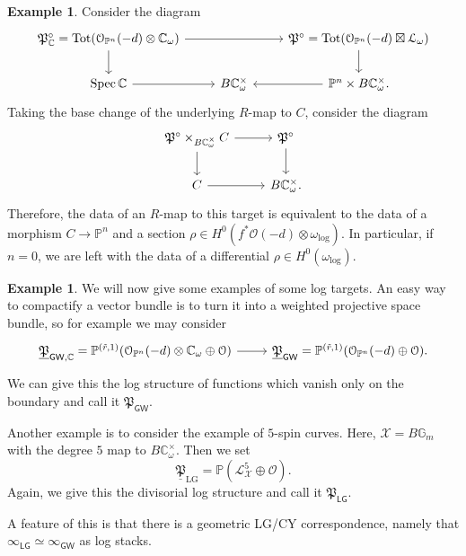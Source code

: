 \documentclass[10pt,oldfontcommands,oneside]{memoir}
\theoremstyle{definition}
\newtheorem{exm}[thm]{Example}
\theoremstyle{remark}
\theoremstyle{plain}
\theoremstyle{definition}
\theoremstyle{remark}
\newcommand{\G}{\mathbb{G}}
\newcommand{\C}{\mathbb{C}}
\renewcommand{\P}{\mathbb{P}}
\newcommand{\mc}[1]{\mathcal{#1}}
\newcommand{\mf}[1]{\mathfrak{#1}}
\newcommand{\mr}[1]{\mathrm{#1}}
\newcommand{\on}[1]{\operatorname{#1}}
\newcommand{\ms}[1]{\mathsf{#1}}
\newcommand{\ul}[1]{\underline{#1}}
\newcommand{\1}{\mathbf{1}}
\newcommand{\2}{\mathbf{2}}
\newcommand{\3}{\mathbf{3}}
\newcommand{\GW}{\ms{GW}}
\newcommand{\LG}{\ms{LG}}
\DeclareMathOperator{\Spec}{Spec}
\begin{document}
\begin{exm}
    Consider the diagram
    \begin{equation*}
    \begin{tikzcd}
        \mf{P}_{\C}^{\circ} = \on{Tot}(\mc{O}_{\P^n}(-d) \otimes \C_{\omega}) \ar{rr} \ar{d} & & \mf{P}^{\circ} = \on{Tot}(\mc{O}_{\P^n}(-d) \boxtimes \mc{L}_{\omega}) \ar{d} \\
        \Spec \C \ar{r} & B \C^{\times}_{\omega} & \P^n \times B \C_{\omega}^{\times} \ar{l}.
    \end{tikzcd}
    \end{equation*}
    Taking the base change of the underlying $R$-map to $C$, consider the diagram
    \begin{equation*}
    \begin{tikzcd}
        \mf{P}^{\circ} \times_{B \C_{\omega}^{\times}} C \ar{r} \ar{d} & \mf{P}^{\circ} \ar{d} \\
        C \ar{r} & B \C_{\omega}^{\times}.
    \end{tikzcd}
    \end{equation*}
    Therefore, the data of an $R$-map to this target is equivalent to the data of a morphism $C \to \P^n$ and a section $\rho \in H^0(f^* \mc{O}(-d) \otimes \omega_{\log})$. In particular, if $n=0$, we are left with the data of a differential $\rho \in H^0(\omega_{\log})$.
\end{exm}

\begin{exm}
    We will now give some examples of some log targets. An easy way to compactify a vector bundle is to turn it into a weighted projective space bundle, so for example we may consider
    \begin{equation*}
    \begin{tikzcd}
        \ul{\mf{P}}_{\ms{GW}, \C} = \P^{(\tilde{r},1)}(\mc{O}_{\P^n}(-d) \otimes \C_{\omega} \oplus \mc{O}) \ar{r} & \ul{\mf{P}}_{\ms{GW}} = \P^{(\tilde{r}, 1)}(\mc{O}_{\P^n}(-d) \oplus \mc{O}).
    \end{tikzcd}
    \end{equation*}
    We can give this the log structure of functions which vanish only on the boundary and call it $\mf{P}_{\GW}$.

    Another example is to consider the example of $5$-spin curves. Here, $\mc{X} = B \G_m$ with the degree $5$ map to $B \C_{\omega}^{\times}$. Then we set
    \[ \ul{\mf{P}}_{\mr{LG}} = \P(\mc{L}_{\mc{X}}^5 \oplus \mc{O}). \]
    Again, we give this the divisorial log structure and call it $\mf{P}_{\LG}$.

    A feature of this is that there is a geometric LG/CY correspondence, namely that $\infty_{\LG} \simeq \infty_{\GW}$ as log stacks.
\end{exm}
\end{document}
